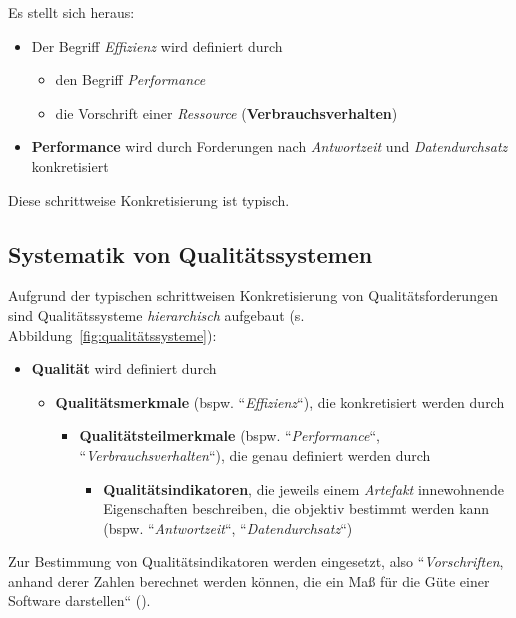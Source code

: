 \noindent
Es stellt sich heraus:

\begin{itemize}
    \item Der Begriff \textit{Effizienz} wird definiert durch
    \begin{itemize}
        \item den Begriff \textit{Performance}
        \item die Vorschrift einer \textit{Ressource} (\textbf{Verbrauchsverhalten})
    \end{itemize}
    \item \textbf{Performance} wird durch Forderungen nach \textit{Antwortzeit} und \textit{Datendurchsatz} konkretisiert
\end{itemize}

\noindent
Diese schrittweise Konkretisierung ist typisch.

\subsection*{Systematik von Qualitätssystemen}
Aufgrund der typischen schrittweisen Konkretisierung von Qualitätsforderungen sind Qualitätssysteme  \textit{hierarchisch} aufgebaut (s. Abbildung~\ref{fig:qualitätssysteme}):

\begin{itemize}
    \item \textbf{Qualität} wird definiert durch
    \begin{itemize}
        \item  \textbf{Qualitätsmerkmale} (bspw. ``\textit{Effizienz}``), die konkretisiert werden durch
        \begin{itemize}
            \item  \textbf{Qualitätsteilmerkmale} (bspw. ``\textit{Performance}``, ``\textit{Verbrauchsverhalten}``), die genau definiert werden durch
             \begin{itemize}
                       \item \textbf{Qualitätsindikatoren}, die jeweils einem \textit{Artefakt} innewohnende Eigenschaften beschreiben, die objektiv bestimmt werden kann (bspw. ``\textit{Antwortzeit}``, ``\textit{Datendurchsatz}``)
            \end{itemize}
        \end{itemize}
    \end{itemize}
\end{itemize}

\noindent
Zur Bestimmung von Qualitätsindikatoren werden  eingesetzt, also ``\textit{Vorschriften}, anhand derer Zahlen berechnet werden können, die ein Maß für die Güte einer Software darstellen`` (\cite[3, Hervorhebung eigene]{Wed09c}).


